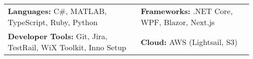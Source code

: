 
\begin{tabular}{p{10.5cm}p{8cm}}
    {\textbf{Languages:} C\#, MATLAB, TypeScript, Ruby, Python} & {\textbf{Frameworks:} .NET Core, WPF, Blazor, Next.js} \\
    {\textbf{Developer Tools:} Git, Jira, TestRail, WiX Toolkit, Inno Setup} & \textbf{Cloud:} AWS (Lightsail, S3) \\
\end{tabular}